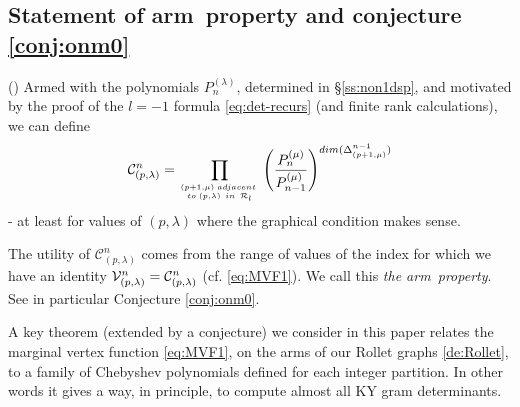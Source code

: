 \documentclass{article}
\newcommand{\ppm}[1]{\textcolor{red}{#1}}
\newcommand{\ppmm}[1]{#1}  %
\newcommand{\bajm}[1]{\textcolor{blue}{#1}}
\theoremstyle{definition}
\newcommand{\beq}{\begin{equation}}
\newcommand{\eq}{\end{equation}}
\newcommand{\mdef}{\refstepcounter{theorem}       \medskip \noindent ({\bf \thetheorem}) }
\newcommand{\Deltaa}{\Delta}   %
\def\l{\lambda}
\numberwithin{equation}{subsection}
\begin{document}
\newcommand{\ournotmain}{arm}

\subsection{Statement of \ournotmain\ property and conjecture \ref{conj:onm0}}
\label{ss:e-next!}


\newcommand{\CC}{{\mathcal C}}  %

\mdef   \label{de:arm-property}
Armed with the polynomials $P_n^{(\l)}$, determined in \S\ref{ss:non1dsp}, 
\ppmm{and motivated by the proof of the $l=-1$ formula \eqref{eq:det-recurs} (and finite rank calculations),}
we can define 
\beq  \label{eq:defCC} 
\CC^{\ppmm{n}}_{(p,\lambda)} 
= \prod_{{(p+1,\mu )\; adjacent \; \atop to \; (p,\lambda) \ in \ \Roll_l}} 
     \left( \frac{P_n^{(\mu)}}{P_{n-1}^{(\mu)}} \right)^{dim (\Deltaa^{n-1}_{(p+1,\mu )}) } 
\eq 
- at least for values of $(p,\lambda)$ where the graphical condition makes sense. 

The utility of $\CC^n_{(p,\l)}$ comes from the range of values of the index for which we have 
an identity $\V^n_{(p,\lambda)} = \CC^n_{(p,\lambda)}$ (cf. \ref{eq:MVF1}). 
We call this {\em the \ournotmain\ property}. 
See in particular Conjecture \ref{conj:onm0}. 

\medskip 

A key theorem (extended by a conjecture) we consider in this paper relates the marginal vertex function 
\eqref{eq:MVF1}, 
on the arms of our Rollet graphs 
\ref{de:Rollet}, 
to a family of Chebyshev polynomials defined for each integer partition. 
In other words it gives a way, in principle, to compute almost all KY gram determinants. 

\end{document}
